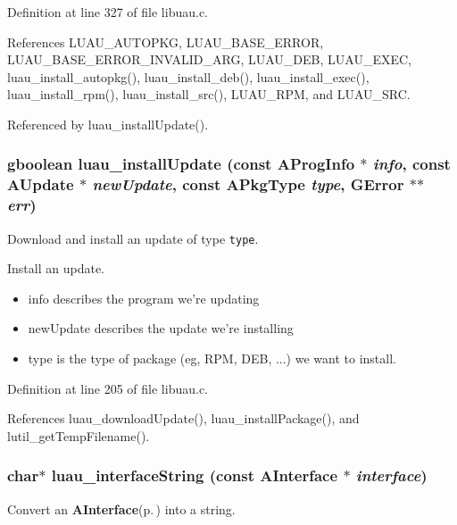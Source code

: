 Definition at line 327 of file libuau.c.

References LUAU\_\-AUTOPKG, LUAU\_\-BASE\_\-ERROR, LUAU\_\-BASE\_\-ERROR\_\-INVALID\_\-ARG, LUAU\_\-DEB, LUAU\_\-EXEC, luau\_\-install\_\-autopkg(), luau\_\-install\_\-deb(), luau\_\-install\_\-exec(), luau\_\-install\_\-rpm(), luau\_\-install\_\-src(), LUAU\_\-RPM, and LUAU\_\-SRC.

Referenced by luau\_\-install\-Update().
\subsubsection{\setlength{\rightskip}{0pt plus 5cm}gboolean luau\_\-install\-Update (const {\bf AProg\-Info} $\ast$ {\em info}, const {\bf AUpdate} $\ast$ {\em new\-Update}, const {\bf APkg\-Type} {\em type}, GError $\ast$$\ast$ {\em err})}\label{libuau_8h_a55}


Download and install an update of type {\tt type}. 

Install an update.

\begin{itemize}
\item info describes the program we're updating \item new\-Update describes the update we're installing \item type is the type of package (eg, RPM, DEB, ...) we want to install. 
\end{itemize}


Definition at line 205 of file libuau.c.

References luau\_\-download\-Update(), luau\_\-install\-Package(), and lutil\_\-get\-Temp\-Filename().
\subsubsection{\setlength{\rightskip}{0pt plus 5cm}char$\ast$ luau\_\-interface\-String (const {\bf AInterface} $\ast$ {\em interface})}\label{libuau_8h_a67}


Convert an {\bf AInterface}{\rm (p.\,\pageref{structAInterface})} into a string. 

